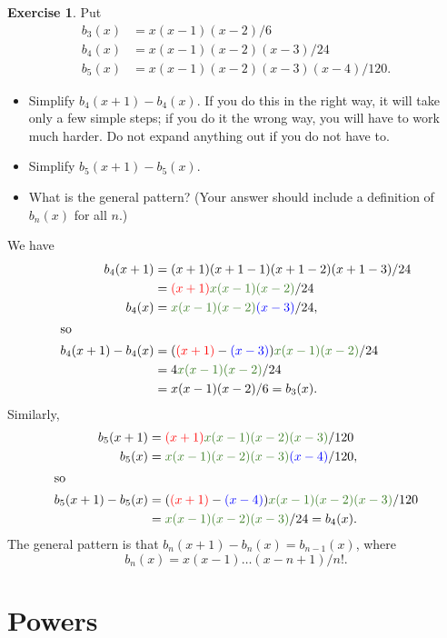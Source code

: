 \documentclass[a4paper]{book}
\newcommand{\RED}[1]{{\color{red}#1}}
\newcommand{\BLUE}[1]{{\color{blue}#1}}
\newcommand{\OLIVEGREEN}[1]{{\color{olivegreen}#1}}
\renewcommand{\:}{\colon}
\theoremstyle{definition}
\newtheorem{exercise}[theorem]{Exercise}
\renewenvironment{solution}{\SolutionInline}{\endSolutionInline}
\begin{document}
\begin{exercise}
 Put
 \begin{align*}
  b_3(x) &= x(x-1)(x-2)/6 \\
  b_4(x) &= x(x-1)(x-2)(x-3)/24 \\
  b_5(x) &= x(x-1)(x-2)(x-3)(x-4)/120.
 \end{align*}
 \begin{itemize}
  \item Simplify $b_4(x+1)-b_4(x)$.  If you do this in the right way,
   it will take only a few simple steps; if you do it the wrong way,
   you will have to work much harder.  Do not expand anything out if
   you do not have to.
  \item Simplify $b_5(x+1)-b_5(x)$.
  \item What is the general pattern?  (Your answer should include a 
   definition of $b_n(x)$ for all $n$.)
 \end{itemize}
\end{exercise}
\begin{solution}
 We have
 \begin{align*}
  b_4(x+1) &= (x+1)(x+1-1)(x+1-2)(x+1-3)/24 \\
           &= \RED{(x+1)}\OLIVEGREEN{x(x-1)(x-2)}/24 \\
  b_4(x)   &= \OLIVEGREEN{x(x-1)(x-2)}\BLUE{(x-3)}/24, \\
  \intertext{so}
  b_4(x+1)-b_4(x) &= 
   (\RED{(x+1)}-\BLUE{(x-3)})\OLIVEGREEN{x(x-1)(x-2)}/24 \\
  &= 4\OLIVEGREEN{x(x-1)(x-2)}/24 \\
  &= x(x-1)(x-2)/6 = b_3(x).
 \end{align*}
 Similarly,
 \begin{align*}
  b_5(x+1) &= \RED{(x+1)}\OLIVEGREEN{x(x-1)(x-2)(x-3)}/120 \\
  b_5(x)   &= \OLIVEGREEN{x(x-1)(x-2)(x-3)}\BLUE{(x-4)}/120, \\
  \intertext{so}
  b_5(x+1)-b_5(x) &= 
   (\RED{(x+1)}-\BLUE{(x-4)})\OLIVEGREEN{x(x-1)(x-2)(x-3)}/120 \\
  &= \OLIVEGREEN{x(x-1)(x-2)(x-3)}/24 = b_4(x).
 \end{align*}
 The general pattern is that $b_n(x+1)-b_n(x)=b_{n-1}(x)$, where
 \[ b_n(x) = x(x-1)\ldots(x-n+1)/n!. \]
\end{solution}


\section{Powers}
\label{sec-powers}
\end{document}
